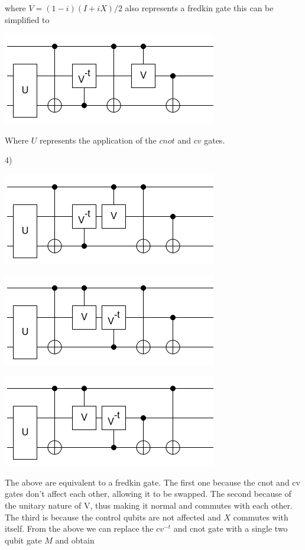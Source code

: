 where $V  = (1-i)(I+iX)/2$ also represents a fredkin gate this can be simplified to 

\includegraphics[scale = 0.5]{images/4.25.3.png} 

Where $U$ represents the application of the $cnot$ and $cv$ gates.

4) 

\includegraphics[scale = 0.5]{images/4.25.4.png}

\includegraphics[scale = 0.5]{images/4.25.5.png}

\includegraphics[scale = 0.5]{images/4.25.6.png}

The above are equivalent to a fredkin gate. The first one because the cnot and cv gates don't affect each other, allowing it to be swapped. The second because of the unitary nature of V, thus making it normal and commutes with each other. The third is because the control qubits are not affected and $X$ commutes with itself. From the above we can replace the $cv^{-t}$ and cnot gate with a single two qubit gate $M$ and obtain

